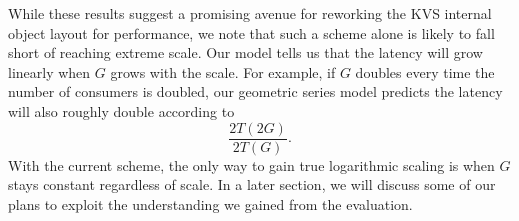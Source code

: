 While these results suggest a promising avenue for reworking the KVS internal
object layout for performance, we note that such a scheme alone
is likely to fall short of reaching extreme scale.
Our model tells us that the latency will grow linearly when $G$ grows
with the scale.   For example, if $G$ doubles every time the number of
consumers is doubled, our geometric series model predicts the latency will
also roughly double according to
\begin{equation}
\frac{2T(2G)}{2T(G)}.
\end{equation}
With the current scheme, the only way to gain true logarithmic
scaling is when $G$ stays constant regardless of scale. 
In a later section, we will discuss some of our plans 
to exploit the understanding we gained from the evaluation. 
